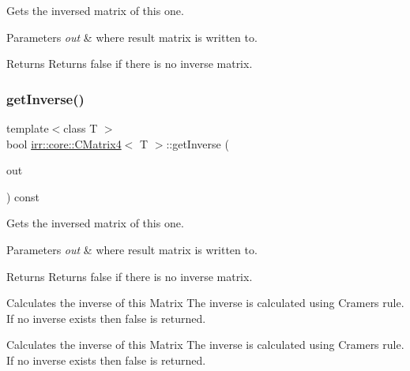 Gets the inversed matrix of this one. 


\begin{DoxyParams}{Parameters}
{\em out} & where result matrix is written to. \\
\hline
\end{DoxyParams}
\begin{DoxyReturn}{Returns}
Returns false if there is no inverse matrix. 
\end{DoxyReturn}
\mbox{\label{classirr_1_1core_1_1CMatrix4_a323bfa0e327636c9cd4a5d2b781b3a60}} 
\subsubsection{\texorpdfstring{get\+Inverse()}{getInverse()}\hspace{0.1cm}{\footnotesize\ttfamily [2/2]}}
{\footnotesize\ttfamily template$<$class T $>$ \\
bool \hyperlink{classirr_1_1core_1_1CMatrix4}{irr\+::core\+::\+C\+Matrix4}$<$ T $>$\+::get\+Inverse (\begin{DoxyParamCaption}\item[{\hyperlink{classirr_1_1core_1_1CMatrix4}{C\+Matrix4}$<$ T $>$ \&}]{out }\end{DoxyParamCaption}) const\hspace{0.3cm}{\ttfamily [inline]}}



Gets the inversed matrix of this one. 


\begin{DoxyParams}{Parameters}
{\em out} & where result matrix is written to. \\
\hline
\end{DoxyParams}
\begin{DoxyReturn}{Returns}
Returns false if there is no inverse matrix. 
\end{DoxyReturn}
Calculates the inverse of this Matrix The inverse is calculated using Cramers rule. If no inverse exists then \textquotesingle{}false\textquotesingle{} is returned.

Calculates the inverse of this Matrix The inverse is calculated using Cramers rule. If no inverse exists then \textquotesingle{}false\textquotesingle{} is returned. \mbox{\label{classirr_1_1core_1_1CMatrix4_aaeab6a8672ecc3d9790c8e7f141db795}} 
